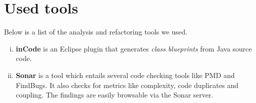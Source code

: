 \documentclass[a4paper, 10pt]{article}
\begin{document}
\newpage
\section{Used tools}
\label{sec:used_tools}

Below is a list of the analysis and refactoring tools we used.


\begin{enumerate}[i)]
\item \textbf{inCode} is an Eclipse plugin that generates \emph{class
    blueprints} from Java source code.
\item \textbf{Sonar}
	is a tool which entails several code checking tools like PMD and FindBugs. It also checks for metrics like complexity, code duplicates and coupling.
	The findings are easily browsable via the Sonar server.
\end{enumerate}


\end{document}
